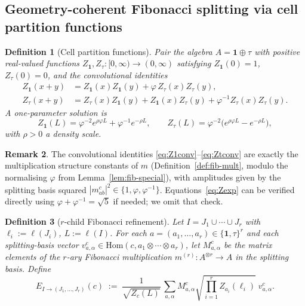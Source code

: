 \documentclass[11pt,a4paper]{article}
\newtheorem{definition}{Definition}[section]
\theoremstyle{definition}
\newtheorem{remark}[definition]{Remark}
\newcommand{\Hom}{\mathrm{Hom}}
\newcommand{\one}{\mathbf{1}}
\begin{document}
\subsection{Geometry-coherent Fibonacci splitting via cell partition functions}

\begin{definition}[Cell partition functions]\label{def:Zfunc}
Pair the algebra $A = \one\oplus\tau$ with positive real-valued functions
$Z_\one,Z_\tau:[0,\infty)\to(0,\infty)$ satisfying $Z_\one(0)=1$,
$Z_\tau(0)=0$, and the convolutional identities
\begin{align}
Z_\one(x+y) &= Z_\one(x)Z_\one(y) + \varphi\,Z_\tau(x)Z_\tau(y),
\label{eq:Z1conv}\\
Z_\tau(x+y) &= Z_\tau(x)Z_\one(y) + Z_\one(x)Z_\tau(y) + \varphi^{-1}Z_\tau(x)Z_\tau(y).
\label{eq:Ztconv}
\end{align}
A one-parameter solution is
\begin{equation}\label{eq:Zexp}
Z_\one(L) = \varphi^{-2}e^{\rho\varphi L} + \varphi^{-1}e^{-\rho L}, \qquad
Z_\tau(L) = \varphi^{-2}\bigl(e^{\rho\varphi L} - e^{-\rho L}\bigr),
\end{equation}
with $\rho>0$ a density scale.
\end{definition}

\begin{remark}
The convolutional identities \eqref{eq:Z1conv}--\eqref{eq:Ztconv} are exactly
the multiplication structure constants of $m$ (Definition~\ref{def:fib-mult},
modulo the normalising $\varphi$ from Lemma~\ref{lem:fib-special}), with
amplitudes given by the splitting basis squared $|m^{c}_{ab}|^{2}\in
\{1,\varphi,\varphi^{-1}\}$. Equations~\eqref{eq:Zexp} can be verified
directly using $\varphi+\varphi^{-1}=\sqrt 5$ if needed; we omit that check.
\end{remark}

\begin{definition}[$r$-child Fibonacci refinement]\label{def:rchild}
Let $I = J_1\cup\cdots\cup J_r$ with $\ell_i := \ell(J_i)$, $L := \ell(I)$.
For each $a = (a_1,\dots,a_r)\in\{\one,\tau\}^{r}$ and each splitting-basis
vector $v^{c}_{a,\alpha}\in\Hom(c,a_1\otimes\cdots\otimes a_r)$, let
$M^{c}_{a,\alpha}$ be the matrix elements of the $r$-ary Fibonacci
multiplication $m^{(r)}:A^{\otimes r}\to A$ in the splitting basis. Define
\[
E_{I\to(J_1,\dots,J_r)}(c)
\;:=\;
\frac{1}{\sqrt{Z_c(L)}}\,
\sum_{a,\alpha} M^{c}_{a,\alpha}
\sqrt{\prod_{i=1}^{r} Z_{a_i}(\ell_i)}\;v^{c}_{a,\alpha}.
\]
\end{definition}
\end{document}
